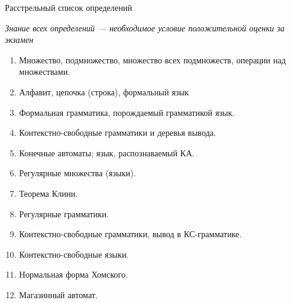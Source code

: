 \documentclass[12pt]{article}
\begin{document}
\begin{center}
{\LARGE Расстрельный список определений}

{\emph{ Знание всех определений --- необходимое условие положительной оценки за экзамен }}
\end{center}

\begin{enumerate}
  \item {Множество, подмножество, множество всех подмножеств, операции над множествами.}
  \item {Алфавит, цепочка (строка), формальный язык}
  \item {Формальная грамматика, порождаемый грамматикой язык.}
  \item {Контекстно-свободные грамматики и деревья вывода.}
  \item {Конечные автоматы; язык, распознаваемый КА. }
  \item {Регулярные множества (языки). }
  \item {Теорема Клини.}
  \item {Регулярные грамматики.}
  \item {Контекстно-свободные грамматики, вывод в КС-грамматике.}
  \item {Контекстно-свободные языки.}
  \item {Нормальная форма Хомского.}
  \item {Магазинный автомат.}
\end{enumerate}
\end{document}
